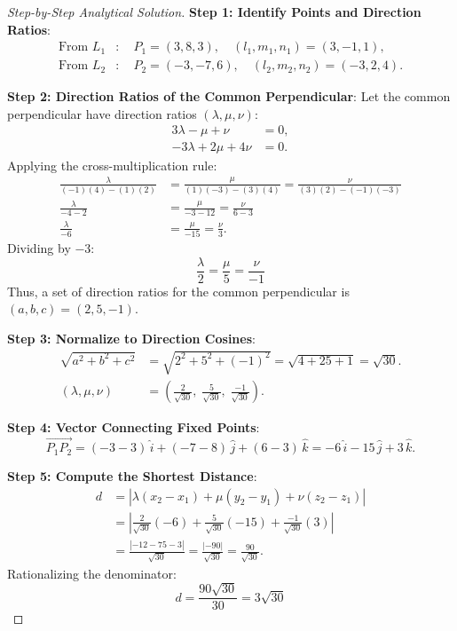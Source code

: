 \begin{proof}[Step-by-Step Analytical Solution]
\textbf{Step 1: Identify Points and Direction Ratios}:
\begin{align}
    \text{From } L_1 &: \quad P_1 = (3, 8, 3), \quad (l_1, m_1, n_1) = (3, -1, 1), \\
    \text{From } L_2 &: \quad P_2 = (-3, -7, 6), \quad (l_2, m_2, n_2) = (-3, 2, 4).
\end{align}

\textbf{Step 2: Direction Ratios of the Common Perpendicular}:
Let the common perpendicular have direction ratios $(\lambda, \mu, \nu)$:
\begin{align}
    3\lambda - \mu + \nu &= 0, \\
    -3\lambda + 2\mu + 4\nu &= 0.
\end{align}
Applying the cross-multiplication rule:
\begin{align}
    \frac{\lambda}{(-1)(4) - (1)(2)} &= \frac{\mu}{(1)(-3) - (3)(4)} = \frac{\nu}{(3)(2) - (-1)(-3)} \nonumber\\
    \frac{\lambda}{-4 - 2} &= \frac{\mu}{-3 - 12} = \frac{\nu}{6 - 3} \nonumber\\
    \frac{\lambda}{-6} &= \frac{\mu}{-15} = \frac{\nu}{3}.
\end{align}
Dividing by $-3$:
\begin{equation}
    \boxed{\frac{\lambda}{2} = \frac{\mu}{5} = \frac{\nu}{-1}}
\end{equation}
Thus, a set of direction ratios for the common perpendicular is $(a, b, c) = (2, 5, -1)$.

\textbf{Step 3: Normalize to Direction Cosines}:
\begin{align}
    \sqrt{a^2 + b^2 + c^2} &= \sqrt{2^2 + 5^2 + (-1)^2} = \sqrt{4 + 25 + 1} = \sqrt{30}. \\
    (\lambda, \mu, \nu) &= \left(\frac{2}{\sqrt{30}}, \; \frac{5}{\sqrt{30}}, \; \frac{-1}{\sqrt{30}}\right).
\end{align}

\textbf{Step 4: Vector Connecting Fixed Points}:
\begin{equation}
    \vec{P_1 P_2} = (-3 - 3)\,\hat{i} + (-7 - 8)\,\hat{j} + (6 - 3)\,\hat{k} = -6\,\hat{i} - 15\,\hat{j} + 3\,\hat{k}.
\end{equation}

\textbf{Step 5: Compute the Shortest Distance}:
\begin{align}
    d &= |\lambda(x_2 - x_1) + \mu(y_2 - y_1) + \nu(z_2 - z_1)| \nonumber\\
    &= \left| \frac{2}{\sqrt{30}}(-6) + \frac{5}{\sqrt{30}}(-15) + \frac{-1}{\sqrt{30}}(3) \right| \nonumber\\
    &= \frac{|-12 - 75 - 3|}{\sqrt{30}} = \frac{|-90|}{\sqrt{30}} = \frac{90}{\sqrt{30}}.
\end{align}
Rationalizing the denominator:
\begin{equation}
    \boxed{d = \frac{90\sqrt{30}}{30} = 3\sqrt{30}}
\end{equation}
\end{proof}

